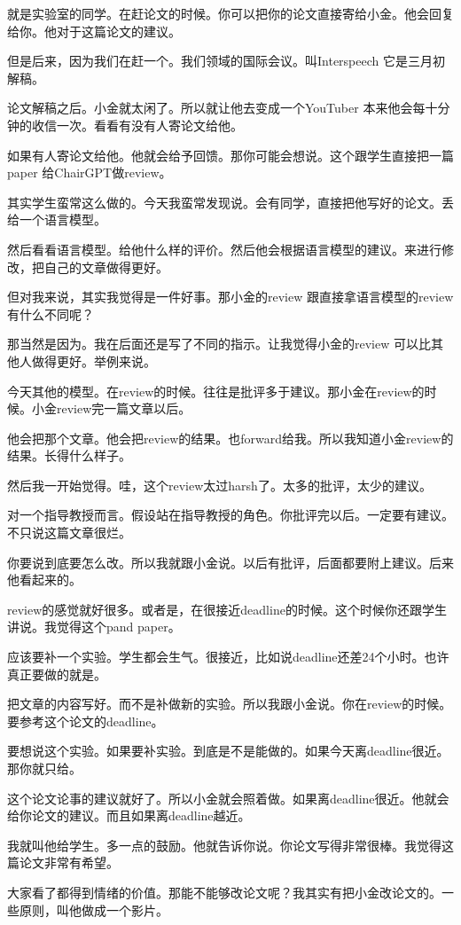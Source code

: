 \documentclass[12pt,a4paper]{article}
\begin{document}
就是实验室的同学。在赶论文的时候。你可以把你的论文直接寄给小金。他会回复给你。他对于这篇论文的建议。

但是后来，因为我们在赶一个。我们领域的国际会议。叫Interspeech 它是三月初解稿。

论文解稿之后。小金就太闲了。所以就让他去变成一个YouTuber 本来他会每十分钟的收信一次。看看有没有人寄论文给他。

如果有人寄论文给他。他就会给予回馈。那你可能会想说。这个跟学生直接把一篇paper 给ChairGPT做review。

其实学生蛮常这么做的。今天我蛮常发现说。会有同学，直接把他写好的论文。丢给一个语言模型。

然后看看语言模型。给他什么样的评价。然后他会根据语言模型的建议。来进行修改，把自己的文章做得更好。

但对我来说，其实我觉得是一件好事。那小金的review 跟直接拿语言模型的review 有什么不同呢？

那当然是因为。我在后面还是写了不同的指示。让我觉得小金的review 可以比其他人做得更好。举例来说。

今天其他的模型。在review的时候。往往是批评多于建议。那小金在review的时候。小金review完一篇文章以后。

他会把那个文章。他会把review的结果。也forward给我。所以我知道小金review的结果。长得什么样子。

然后我一开始觉得。哇，这个review太过harsh了。太多的批评，太少的建议。

对一个指导教授而言。假设站在指导教授的角色。你批评完以后。一定要有建议。不只说这篇文章很烂。

你要说到底要怎么改。所以我就跟小金说。以后有批评，后面都要附上建议。后来他看起来的。

review的感觉就好很多。或者是，在很接近deadline的时候。这个时候你还跟学生讲说。我觉得这个pand paper。

应该要补一个实验。学生都会生气。很接近，比如说deadline还差24个小时。也许真正要做的就是。

把文章的内容写好。而不是补做新的实验。所以我跟小金说。你在review的时候。要参考这个论文的deadline。

要想说这个实验。如果要补实验。到底是不是能做的。如果今天离deadline很近。那你就只给。

这个论文论事的建议就好了。所以小金就会照着做。如果离deadline很近。他就会给你论文的建议。而且如果离deadline越近。

我就叫他给学生。多一点的鼓励。他就告诉你说。你论文写得非常很棒。我觉得这篇论文非常有希望。

大家看了都得到情绪的价值。那能不能够改论文呢？我其实有把小金改论文的。一些原则，叫他做成一个影片。
\end{document}
